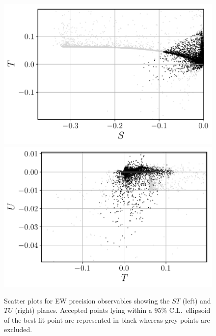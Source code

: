 \documentclass[a4paper,11pt]{article}
\renewcommand{\[}{\left[}
\renewcommand{\]}{\right]}
\begin{document}
\begin{figure}[!htb]
	\centering
	\includegraphics[scale=0.5]{ST.pdf}
	\includegraphics[scale=0.5]{TU.pdf}
	\caption{Scatter plots for EW precision observables showing the $ST$ (left) and $TU$ (right) planes. Accepted points lying within a $95\%$ C.L.~ellipsoid of the best fit point are represented in black whereas grey points are excluded.}
	\label{fig:STU}
\end{figure}	
\end{document}
